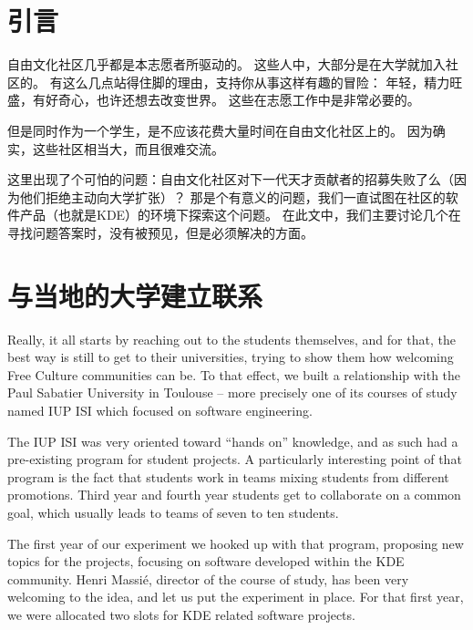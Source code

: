 

\section*{引言}
自由文化社区几乎都是本志愿者所驱动的。
这些人中，大部分是在大学就加入社区的。
有这么几点站得住脚的理由，支持你从事这样有趣的冒险：
年轻，精力旺盛，有好奇心，也许还想去改变世界。
这些在志愿工作中是非常必要的。

但是同时作为一个学生，是不应该花费大量时间在自由文化社区上的。
因为确实，这些社区相当大，而且很难交流。

这里出现了个可怕的问题：自由文化社区对下一代天才贡献者的招募失败了么（因为他们拒绝主动向大学扩张）？
那是个有意义的问题，我们一直试图在社区的软件产品（也就是KDE）的环境下探索这个问题。
在此文中，我们主要讨论几个在寻找问题答案时，没有被预见，但是必须解决的方面。

\section*{与当地的大学建立联系}
Really, it all starts by reaching out to the students themselves, and for that,
the best way is still to get to their universities, trying to show them how
welcoming Free Culture communities can be. To that effect, we built a
relationship with the Paul Sabatier University in Toulouse -- more precisely one
of its courses of study named IUP ISI which focused on software engineering.

The IUP ISI was very oriented toward ``hands on'' knowledge, and as such had a
pre-existing program for student projects. A particularly interesting point of
that program is the fact that students work in teams mixing students from
different promotions. Third year and fourth year students get to collaborate on
a common goal, which usually leads to teams of seven to ten students.

The first year of our experiment we hooked up with that program, proposing new
topics for the projects, focusing on software developed within the KDE
community. Henri Massié, director of the course of study, has been very
welcoming to the idea, and let us put the experiment in place. For that first
year, we were allocated two slots for KDE related software projects.

